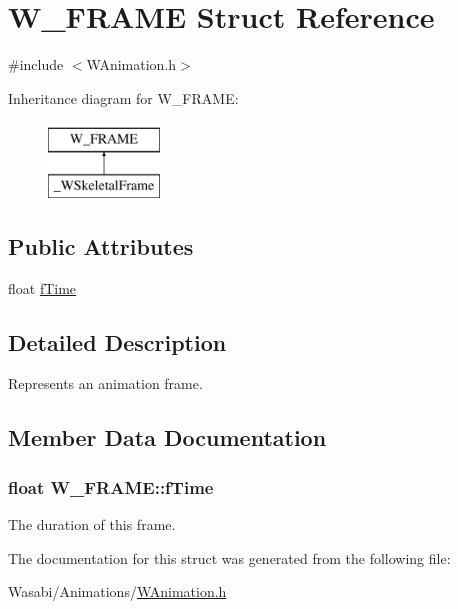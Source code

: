 \hypertarget{struct_w___f_r_a_m_e}{}\section{W\+\_\+\+F\+R\+A\+ME Struct Reference}
\label{struct_w___f_r_a_m_e}


{\ttfamily \#include $<$W\+Animation.\+h$>$}

Inheritance diagram for W\+\_\+\+F\+R\+A\+ME\+:\begin{figure}[H]
\begin{center}
\leavevmode
\includegraphics[height=2.000000cm]{struct_w___f_r_a_m_e}
\end{center}
\end{figure}
\subsection*{Public Attributes}
\begin{DoxyCompactItemize}
\item 
float \hyperlink{struct_w___f_r_a_m_e_a8b4bce41c5a65ffbc6058dec13213784}{f\+Time}
\end{DoxyCompactItemize}


\subsection{Detailed Description}
Represents an animation frame. 

\subsection{Member Data Documentation}
\subsubsection[{\texorpdfstring{f\+Time}{fTime}}]{\setlength{\rightskip}{0pt plus 5cm}float W\+\_\+\+F\+R\+A\+M\+E\+::f\+Time}\hypertarget{struct_w___f_r_a_m_e_a8b4bce41c5a65ffbc6058dec13213784}{}\label{struct_w___f_r_a_m_e_a8b4bce41c5a65ffbc6058dec13213784}
The duration of this frame. 

The documentation for this struct was generated from the following file\+:\begin{DoxyCompactItemize}
\item 
Wasabi/\+Animations/\hyperlink{_w_animation_8h}{W\+Animation.\+h}\end{DoxyCompactItemize}
